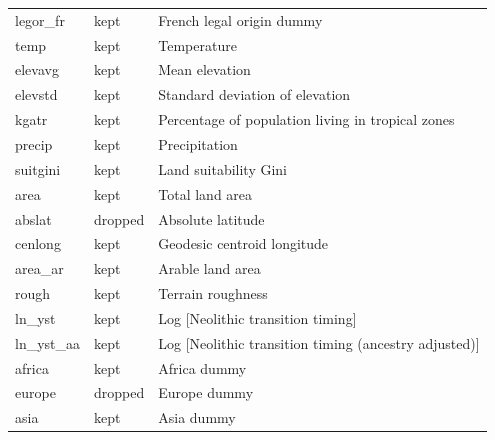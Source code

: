 \begin{tabular}{lll}
 legor\_fr                       & kept     & French legal origin dummy                                                \\
 temp                           & kept     & Temperature                                                              \\
 elevavg                        & kept     & Mean elevation                                                           \\
 elevstd                        & kept     & Standard deviation of elevation                                          \\
 kgatr                          & kept     & Percentage of population living in tropical zones                        \\
 precip                         & kept     & Precipitation                                                            \\
 suitgini                       & kept     & Land suitability Gini                                                    \\
 area                           & kept     & Total land area                                                          \\
 abslat                         & dropped  & Absolute latitude                                                        \\
 cenlong                        & kept     & Geodesic centroid longitude                                              \\
 area\_ar                        & kept     & Arable land area                                                         \\
 rough                          & kept     & Terrain roughness                                                        \\
 ln\_yst                         & kept     & Log [Neolithic transition timing]                                        \\
 ln\_yst\_aa                      & kept     & Log [Neolithic transition timing (ancestry adjusted)]                    \\
 africa                         & kept     & Africa dummy                                                             \\
 europe                         & dropped  & Europe dummy                                                             \\
 asia                           & kept     & Asia dummy                                                               \\

\end{tabular}
